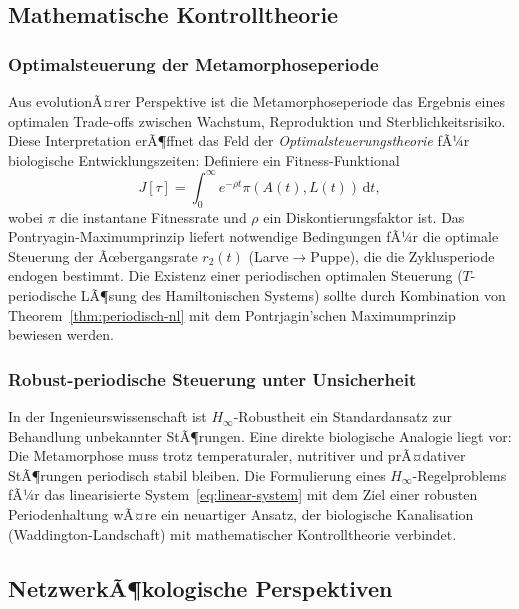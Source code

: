 ﻿\documentclass[12pt, a4paper]{article}
\theoremstyle{definition}
\newcommand{\dd}{\mathrm{d}}
\begin{document}
\subsection{Mathematische Kontrolltheorie}

\subsubsection{Optimalsteuerung der Metamorphoseperiode}
Aus evolutionÃ¤rer Perspektive ist die Metamorphoseperiode das Ergebnis eines
optimalen Trade-offs zwischen Wachstum, Reproduktion und Sterblichkeitsrisiko.
Diese Interpretation erÃ¶ffnet das Feld der \emph{Optimalsteuerungstheorie} fÃ¼r
biologische Entwicklungszeiten: Definiere ein Fitness-Funktional
\[
  J[\tau] = \int_0^\infty e^{-\rho t} \pi(A(t), L(t))\,\dd t,
\]
wobei $\pi$ die instantane Fitnessrate und $\rho$ ein Diskontierungsfaktor ist.
Das Pontryagin-Maximumprinzip liefert notwendige Bedingungen fÃ¼r die optimale
Steuerung der Ãœbergangsrate $r_2(t)$ (Larve$\to$Puppe), die die Zyklusperiode
endogen bestimmt. Die Existenz einer periodischen optimalen Steuerung ($T$-periodische
LÃ¶sung des Hamiltonischen Systems) sollte durch Kombination von Theorem~\ref{thm:periodisch-nl}
mit dem Pontrjagin'schen Maximumprinzip bewiesen werden.

\subsubsection{Robust-periodische Steuerung unter Unsicherheit}
In der Ingenieurswissenschaft ist $H_\infty$-Robustheit ein Standardansatz zur
Behandlung unbekannter StÃ¶rungen. Eine direkte biologische Analogie liegt vor:
Die Metamorphose muss trotz temperaturaler, nutritiver und prÃ¤dativer StÃ¶rungen
periodisch stabil bleiben. Die Formulierung eines $H_\infty$-Regelproblems fÃ¼r
das linearisierte System~\eqref{eq:linear-system} mit dem Ziel einer
robusten Periodenhaltung wÃ¤re ein neuartiger Ansatz, der biologische Kanalisation
(Waddington-Landschaft) mit mathematischer Kontrolltheorie verbindet.

\subsection{NetzwerkÃ¶kologische Perspektiven}
\end{document}
